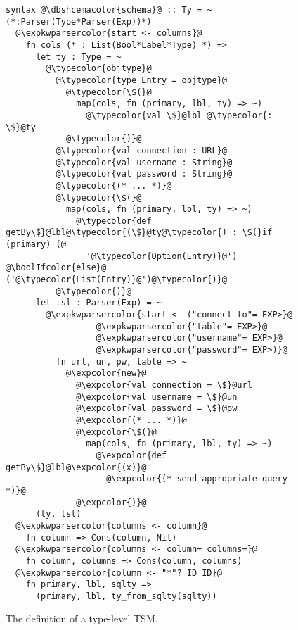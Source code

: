 \documentclass{sig-alternate}[10pt]
\newcommand{\expkwparsercolor}[1]{\textcolor[HTML]{336699}{#1}}
\newcommand{\expcolor}[1]{\textcolor[HTML]{FF0033}{#1}}
\newcommand{\typecolor}[1]{\textcolor[HTML]{660066}{#1}}
\newcommand{\boolIfcolor}[1]{\textcolor[HTML]{CD7300}{#1}}
\newcommand{\dbshcemacolor}[1]{\textcolor[HTML]{5AC3D1}{#1}}
\newcommand{\mycaption}[1]{\vspace{-10px}\caption{#1}\vspace{-8px}}
\begin{document}
\begin{figure}[t]
\begin{lstlisting}[style=wyvern]
syntax @\dbshcemacolor{schema}@ :: Ty = ~ (*:Parser(Type*Parser(Exp))*)
  @\expkwparsercolor{start <- columns}@
    fn cols (* : List(Bool*Label*Type) *) =>
      let ty : Type = ~
        @\typecolor{objtype}@ 
          @\typecolor{type Entry = objtype}@
            @\typecolor{\$(}@
              map(cols, fn (primary, lbl, ty) => ~)
                @\typecolor{val \$}@lbl @\typecolor{:  \$}@ty
            @\typecolor{)}@
          @\typecolor{val connection : URL}@
          @\typecolor{val username : String}@
          @\typecolor{val password : String}@
          @\typecolor{(* ... *)}@
          @\typecolor{\$(}@
            map(cols, fn (primary, lbl, ty) => ~)
              @\typecolor{def getBy\$}@lbl@\typecolor{(\$}@ty@\typecolor{) : \$(}if (primary) (@
                '@\typecolor{Option(Entry)}@') @\boolIfcolor{else}@ ('@\typecolor{List(Entry)}@')@\typecolor{)}@
          @\typecolor{)}@
      let tsl : Parser(Exp) = ~ 
        @\expkwparsercolor{start <- ("connect to"= EXP>}@
                  @\expkwparsercolor{"table"= EXP>}@
                  @\expkwparsercolor{"username"= EXP>}@
                  @\expkwparsercolor{"password"= EXP>)}@
          fn url, un, pw, table => ~
            @\expcolor{new}@ 
              @\expcolor{val connection = \$}@url
              @\expcolor{val username = \$}@un
              @\expcolor{val password = \$}@pw
              @\expcolor{(* ... *)}@
              @\expcolor{\$(}@
                map(cols, fn (primary, lbl, ty) => ~)
                  @\expcolor{def getBy\$}@lbl@\expcolor{(x)}@ 
                    @\expcolor{(* send appropriate query *)}@
              @\expcolor{)}@
      (ty, tsl)
  @\expkwparsercolor{columns <- column}@
    fn column => Cons(column, Nil)
  @\expkwparsercolor{columns <- column= columns=}@
    fn column, columns => Cons(column, columns)
  @\expkwparsercolor{column <- "*"? ID ID}@
    fn primary, lbl, sqlty => 
      (primary, lbl, ty_from_sqlty(sqlty))
\end{lstlisting}
\mycaption{The definition of a type-level TSM.}
\label{typekw-example-1}
\end{figure}
\end{document}
